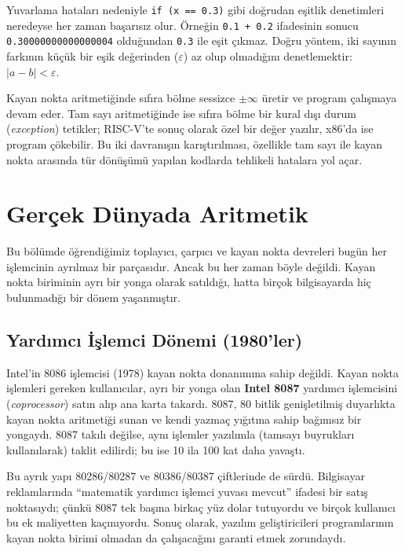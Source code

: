 Yuvarlama hataları nedeniyle \texttt{if (x == 0.3)} gibi doğrudan eşitlik denetimleri neredeyse her zaman başarısız olur. Örneğin \texttt{0.1 + 0.2} ifadesinin sonucu \texttt{0.30000000000000004} olduğundan \texttt{0.3} ile eşit çıkmaz. Doğru yöntem, iki sayının farkının küçük bir eşik değerinden ($\varepsilon$) az olup olmadığını denetlemektir: $|a - b| < \varepsilon$.

Kayan nokta aritmetiğinde sıfıra bölme sessizce $\pm\infty$ üretir ve program çalışmaya devam eder. Tam sayı aritmetiğinde ise sıfıra bölme bir kural dışı durum (\emph{exception}) tetikler; RISC-V'te sonuç olarak özel bir değer yazılır, x86'da ise program çökebilir. Bu iki davranışın karıştırılması, özellikle tam sayı ile kayan nokta arasında tür dönüşümü yapılan kodlarda tehlikeli hatalara yol açar.


\section{Gerçek Dünyada Aritmetik}
\label{sec:gercek-dunyada-aritmetik}

Bu bölümde öğrendiğimiz toplayıcı, çarpıcı ve kayan nokta devreleri bugün her işlemcinin ayrılmaz bir parçasıdır. Ancak bu her zaman böyle değildi. Kayan nokta biriminin ayrı bir yonga olarak satıldığı, hatta birçok bilgisayarda hiç bulunmadığı bir dönem yaşanmıştır.

\subsection{Yardımcı İşlemci Dönemi (1980'ler)}
Intel'in 8086 işlemcisi (1978) kayan nokta donanımına sahip değildi. Kayan nokta işlemleri gereken kullanıcılar, ayrı bir yonga olan \textbf{Intel 8087} yardımcı işlemcisini (\emph{coprocessor}) satın alıp ana karta takardı. 8087, 80 bitlik genişletilmiş duyarlıkta kayan nokta aritmetiği sunan ve kendi yazmaç yığıtına sahip bağımsız bir yongaydı. 8087 takılı değilse, aynı işlemler yazılımla (tamsayı buyrukları kullanılarak) taklit edilirdi; bu ise 10 ila 100 kat daha yavaştı.

Bu ayrık yapı 80286/80287 ve 80386/80387 çiftlerinde de sürdü. Bilgisayar reklamlarında ``matematik yardımcı işlemci yuvası mevcut'' ifadesi bir satış noktasıydı; çünkü 8087 tek başına birkaç yüz dolar tutuyordu ve birçok kullanıcı bu ek maliyetten kaçınıyordu. Sonuç olarak, yazılım geliştiricileri programlarının kayan nokta birimi olmadan da çalışacağını garanti etmek zorundaydı.

